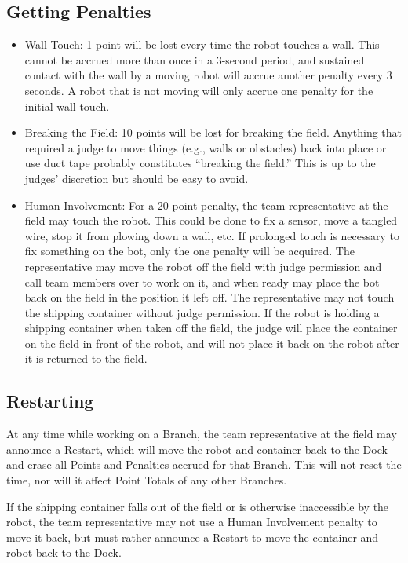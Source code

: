 \subsection{Getting Penalties}
\begin{itemize}
    \item Wall Touch: 1 point will be lost every time the robot touches a wall. This cannot be accrued more than once in a 3-second period, and sustained contact with the wall by a moving robot will accrue another penalty every 3 seconds. A robot that is not moving will only accrue one penalty for the initial wall touch.
    \item Breaking the Field: 10 points will be lost for breaking the field. Anything that required a judge to move things (e.g., walls or obstacles) back into place or use duct tape probably constitutes “breaking the field.” This is up to the judges’ discretion but should be easy to avoid. 
    \item Human Involvement: For a 20 point penalty, the team representative at the field may touch the robot. This could be done to fix a sensor, move a tangled wire, stop it from plowing down a wall, etc. If prolonged touch is necessary to fix something on the bot, only the one penalty will be acquired. The representative may move the robot off the field with judge permission and call team members over to work on it, and when ready may place the bot back on the field in the position it left off. The representative may not touch the shipping container without judge permission. If the robot is holding a shipping container when taken off the field, the judge will place the container on the field in front of the robot, and will not place it back on the robot after it is returned to the field. 

\end{itemize}

\subsection{Restarting}
At any time while working on a Branch, the team representative at the field may announce a Restart, which will move the robot and container back to the Dock and erase all Points and Penalties accrued for that Branch. This will not reset the time, nor will it affect Point Totals of any other Branches. \newline

\noindent
If the shipping container falls out of the field or is otherwise inaccessible by the robot, the team representative may not use a Human Involvement penalty to move it back, but must rather announce a Restart to move the container and robot back to the Dock.
